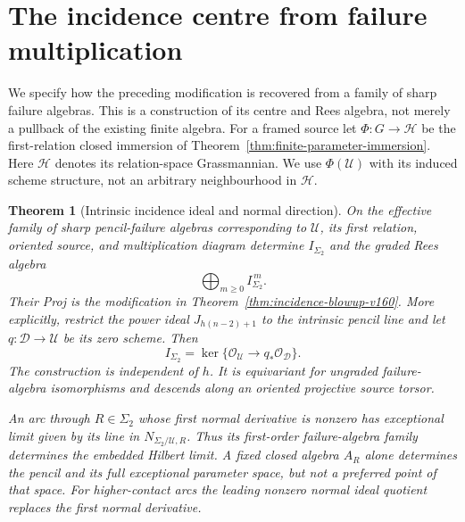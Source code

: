 \documentclass[11pt,reqno]{amsart}
\numberwithin{equation}{section}
\newtheorem{theorem}{Theorem}[section]
\theoremstyle{definition}\newtheorem{definition}[theorem]{Definition}
\theoremstyle{remark}\newtheorem{remark}[theorem]{Remark}
\newcommand{\OO}{\mathcal O}\newcommand{\II}{\mathcal I}
\begin{document}
\section{The incidence centre from failure multiplication}
\label{sec:failure-incidence-v160}
We specify how the preceding modification is recovered from a family
of sharp failure algebras. This is a construction of its centre and
Rees algebra, not merely a pullback of the existing finite algebra.
For a framed source let $\Phi:G\to\mathcal H$ be the first-relation
closed immersion of Theorem~\ref{thm:finite-parameter-immersion}.
Here $\mathcal H$ denotes its relation-space Grassmannian. We use
$\Phi(\mathcal U)$ with its induced scheme structure, not an arbitrary
neighbourhood in $\mathcal H$.

\begin{theorem}[Intrinsic incidence ideal and normal direction]
\label{thm:failure-incidence-v160}
On the effective family of sharp pencil-failure algebras corresponding
to $\mathcal U$, its first relation, oriented source, and multiplication
diagram determine $I_{\Sigma_2}$ and the graded Rees algebra
\begin{equation}\label{eq:failure-rees-v160}
                \bigoplus_{m\geq0}I_{\Sigma_2}^{\,m}.
\end{equation}
Their Proj is the modification in
Theorem~\ref{thm:incidence-blowup-v160}. More explicitly, restrict
the power ideal $J_{h(n-2)+1}$ to the intrinsic pencil line and let
$q:\mathcal D\to\mathcal U$ be its zero scheme. Then
\begin{equation}\label{eq:failure-incidence-ideal-v160}
 I_{\Sigma_2}=\ker\{\OO_{\mathcal U}\longrightarrow q_*\OO_{\mathcal D}\}.
\end{equation}
The construction is independent of $h$. It is equivariant for ungraded
failure-algebra isomorphisms and descends along an oriented projective
source torsor.

An arc through $R\in\Sigma_2$ whose first normal derivative is nonzero
has exceptional limit given by its line in
$N_{\Sigma_2/\mathcal U,R}$. Thus its first-order failure-algebra
family determines the embedded Hilbert limit. A fixed closed algebra
$A_R$ alone determines the pencil and its full exceptional parameter
space, but not a preferred point of that space. For higher-contact
arcs the leading nonzero normal ideal quotient replaces the first
normal derivative.
\end{theorem}
\end{document}
